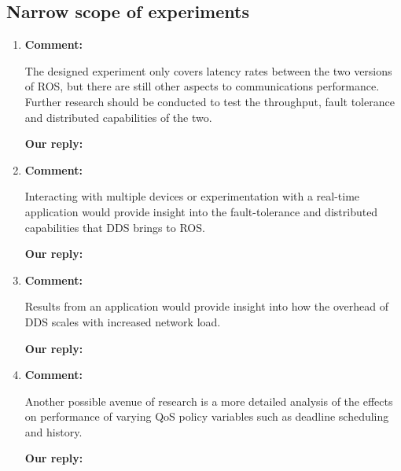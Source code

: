 \documentclass{article}
\begin{document}
\subsection{Narrow scope of experiments}
\begin{enumerate}

\item \begin{flushleft}
    \textbf{Comment:}
  \end{flushleft}
  The designed experiment only covers latency rates between the two versions of ROS, but there are still other aspects to communications performance. Further research should be conducted to test the throughput, fault tolerance and distributed capabilities of the two.

  \begin{flushleft}
    \textbf{Our reply:}
  \end{flushleft}
  

\item \begin{flushleft}
    \textbf{Comment:}
  \end{flushleft}
  Interacting with multiple devices or experimentation with a real-time application would provide insight into the fault-tolerance and distributed capabilities that DDS brings to ROS.

  \begin{flushleft}
    \textbf{Our reply:}
  \end{flushleft}


\item \begin{flushleft}
    \textbf{Comment:}
  \end{flushleft}
  Results from an application would provide insight into how the overhead of DDS scales with increased network load.

  \begin{flushleft}
    \textbf{Our reply:}
  \end{flushleft}


\item \begin{flushleft}
    \textbf{Comment:}
  \end{flushleft}
  Another possible avenue of research is a more detailed analysis of the effects on performance of varying QoS policy variables such as deadline scheduling and history.

  \begin{flushleft}
    \textbf{Our reply:}
  \end{flushleft}



\end{enumerate}
\end{document}
